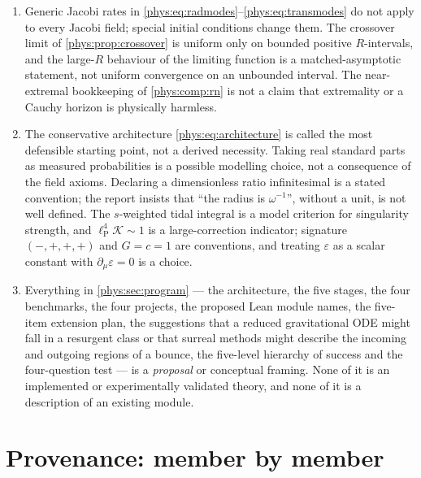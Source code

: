 \documentclass[11pt,letterpaper]{article}
\numberwithin{equation}{section}
\theoremstyle{definition}
\theoremstyle{remark}
\newcommand{\eps}{\varepsilon}
\newcommand{\Kret}{\mathcal K}
\newcommand{\lP}{\ell_{\mathrm P}}
\begin{document}
\begin{enumerate}[label=\textup{N\arabic*.},leftmargin=3.0em,start=22]
sectors, or a different function category. A Schwarzschild Puiseux law
licenses no inference about generic interiors, and charged and rotating
interiors are explicitly not Schwarzschild copies.
\item Generic Jacobi rates in
\eqref{phys:eq:radmodes}--\eqref{phys:eq:transmodes} do not apply to every
Jacobi field; special initial conditions change them. The crossover limit of
\cref{phys:prop:crossover} is uniform only on bounded positive $R$-intervals,
and the large-$R$ behaviour of the limiting function is a matched-asymptotic
statement, not uniform convergence on an unbounded interval. The near-extremal
bookkeeping of \cref{phys:comp:rn} is not a claim that extremality or a Cauchy
horizon is physically harmless.
\item The conservative architecture \eqref{phys:eq:architecture} is called the
most defensible starting point, not a derived necessity. Taking real standard
parts as measured probabilities is a possible modelling choice, not a
consequence of the field axioms. Declaring a dimensionless ratio infinitesimal
is a stated convention; the report insists that ``the radius is
$\omega^{-1}$'', without a unit, is not well defined. The $s$-weighted tidal
integral is a model criterion for singularity strength, and
$\lP^{4}\Kret\sim1$ is a large-correction indicator; signature $(-,+,+,+)$ and
$G=c=1$ are conventions, and treating $\eps$ as a scalar constant with
$\partial_{\mu}\eps=0$ is a choice.
\item Everything in \cref{phys:sec:program} --- the architecture, the five
stages, the four benchmarks, the four projects, the proposed Lean module names,
the five-item extension plan, the suggestions that a reduced gravitational ODE
might fall in a resurgent class or that surreal methods might describe the
incoming and outgoing regions of a bounce, the five-level hierarchy of success
and the four-question test --- is a \emph{proposal} or conceptual framing.
None of it is an implemented or experimentally validated theory, and none of it
is a description of an existing module.
\end{enumerate}

\section{Provenance: member by member}
\label{phys:app:provenance}
\end{document}
